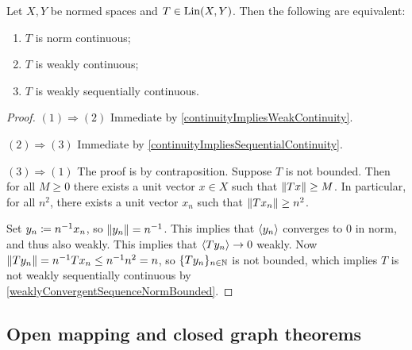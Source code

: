 \begin{proposition}
Let $X,Y$ be normed spaces and $T\in \operatorname{Lin}(X,Y)$. Then the following are equivalent:
\begin{enumerate}
\item $T$ is norm continuous;
\item $T$ is weakly continuous;
\item $T$ is weakly sequentially continuous.
\end{enumerate}
\end{proposition}
\begin{proof}
$(1) \Rightarrow (2)$ Immediate by \ref{continuityImpliesWeakContinuity}.

$(2) \Rightarrow (3)$ Immediate by \ref{continuityImpliesSequentialContinuity}.

$(3) \Rightarrow (1)$ The proof is by contraposition. Suppose $T$ is not bounded. Then for all $M\geq 0$ there exists a unit vector $x\in X$ such that $\lVert Tx\rVert \geq M$. In particular, for all $n^2$, there exists a unit vector $x_n$ such that $\lVert Tx_n\rVert \geq n^2$.

Set $y_n \coloneqq n^{-1}x_n$, so $\lVert y_n\rVert = n^{-1}$. This implies that $\left\langle y_n \right\rangle$ converges to $0$ in norm, and thus also weakly. This implies that $\left\langle Ty_n \right\rangle \to 0$ weakly. Now $\lVert Ty_n\rVert = n^{-1}Tx_n \leq n^{-1}n^2 = n$, so $\{Ty_n\}_{n\in\mathbb{N}}$ is not bounded, which implies $T$ is not weakly sequentially continuous by \ref{weaklyConvergentSequenceNormBounded}.
\end{proof}

\subsection{Open mapping and closed graph theorems}

